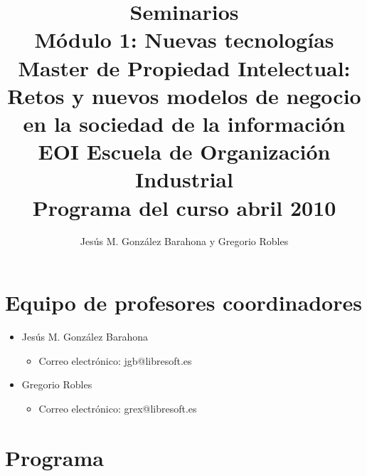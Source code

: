 \documentclass[a4paper,12pt]{article}
\title{Seminarios \\
Módulo 1: Nuevas tecnologías \\
Master de Propiedad Intelectual: \\
Retos y nuevos modelos de negocio en la sociedad de la información \\
EOI Escuela de Organización Industrial \\
Programa del curso abril 2010}
\author{Jesús M. González Barahona y Gregorio Robles}
\begin{document}
\maketitle

\newpage

\tableofcontents

\newpage

\section{Equipo de profesores coordinadores}

\begin{itemize}
\item Jesús M. González Barahona
  \begin{itemize}
  \item Correo electrónico: jgb@libresoft.es
  \end{itemize}
\item Gregorio Robles
  \begin{itemize}
  \item Correo electrónico: grex@libresoft.es
  \end{itemize}
\end{itemize}





\section{Programa}
\end{document}
